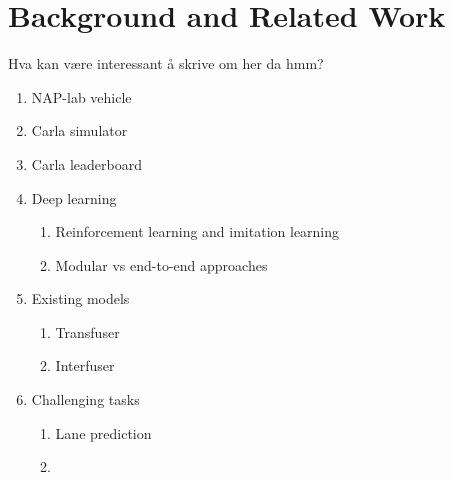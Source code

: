\chapter{Background and Related Work}
\label{chap:background}

Hva kan være interessant å skrive om her da hmm?

\begin{enumerate}

    
    \item NAP-lab vehicle
    
    \item Carla simulator
    \item Carla leaderboard
    
    \item Deep learning
    \begin{enumerate}
        \item Reinforcement learning and imitation learning
        \item Modular vs end-to-end approaches
    \end{enumerate}
    
    \item Existing models
    \begin{enumerate}
        \item Transfuser
        \item Interfuser
    \end{enumerate}
    
    \item Challenging tasks
    \begin{enumerate}
        \item Lane prediction
        \item
    \end{enumerate}
\end{enumerate}

